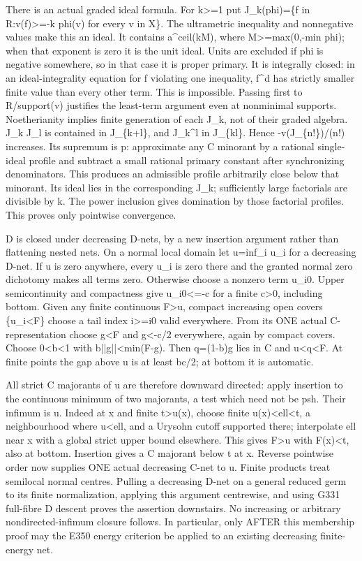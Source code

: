 \documentclass[11pt]{article}
\begin{document}
There is an actual graded ideal formula. For k>=1 put J\_k(phi)=\{f in R:v(f)>=-k phi(v) for every v in X\}. The ultrametric inequality and nonnegative values make this an ideal. It contains a\textasciicircum{}ceil(kM), where M>=max(0,-min phi); when that exponent is zero it is the unit ideal. Units are excluded if phi is negative somewhere, so in that case it is proper primary. It is integrally closed: in an ideal-integrality equation for f violating one inequality, f\textasciicircum{}d has strictly smaller finite value than every other term. This is impossible. Passing first to R/support(v) justifies the least-term argument even at nonminimal supports. Noetherianity implies finite generation of each J\_k, not of their graded algebra. J\_k J\_l is contained in J\_\{k+l\}, and J\_k\textasciicircum{}l in J\_\{kl\}. Hence -v(J\_\{n!\})/(n!) increases. Its supremum is p: approximate any C minorant by a rational single-ideal profile and subtract a small rational primary constant after synchronizing denominators. This produces an admissible profile arbitrarily close below that minorant. Its ideal lies in the corresponding J\_k; sufficiently large factorials are divisible by k. The power inclusion gives domination by those factorial profiles. This proves only pointwise convergence.

D is closed under decreasing D-nets, by a new insertion argument rather than flattening nested nets. On a normal local domain let u=inf\_i u\_i for a decreasing D-net. If u is zero anywhere, every u\_i is zero there and the granted normal zero dichotomy makes all terms zero. Otherwise choose a nonzero term u\_i0. Upper semicontinuity and compactness give u\_i0<=-c for a finite c>0, including bottom. Given any finite continuous F>u, compact increasing open covers \{u\_i<F\} choose a tail index i>=i0 valid everywhere. From its ONE actual C-representation choose g<F and g<-c/2 everywhere, again by compact covers. Choose 0<b<1 with b||g||<min(F-g). Then q=(1-b)g lies in C and u<q<F. At finite points the gap above u is at least bc/2; at bottom it is automatic.

All strict C majorants of u are therefore downward directed: apply insertion to the continuous minimum of two majorants, a test which need not be psh. Their infimum is u. Indeed at x and finite t>u(x), choose finite u(x)<ell<t, a neighbourhood where u<ell, and a Urysohn cutoff supported there; interpolate ell near x with a global strict upper bound elsewhere. This gives F>u with F(x)<t, also at bottom. Insertion gives a C majorant below t at x. Reverse pointwise order now supplies ONE actual decreasing C-net to u. Finite products treat semilocal normal centres. Pulling a decreasing D-net on a general reduced germ to its finite normalization, applying this argument centrewise, and using G331 full-fibre D descent proves the assertion downstairs. No increasing or arbitrary nondirected-infimum closure follows. In particular, only AFTER this membership proof may the E350 energy criterion be applied to an existing decreasing finite-energy net.
\end{document}

